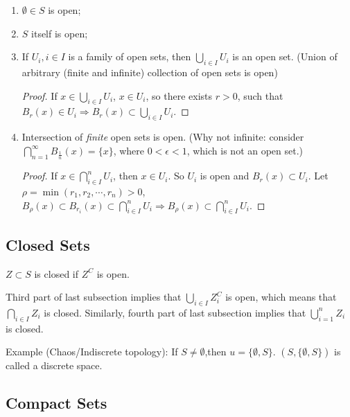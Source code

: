 \documentclass{article}
\begin{document}
        \begin{enumerate}
            \item $\emptyset \in S$ is open;
            \item $S$ itself is open;
            \item If $U_{i}, i \in I$ is a family of open sets, then $\bigcup_{i \in I} U_{i}$ is an open set. (Union of arbitrary (finite and infinite) collection of open sets is open)
            
            \begin{proof}
                If $x \in \bigcup_{i \in I} U_{i}$, $x \in U_{i}$, so there exists $r > 0$, such that $B_{r}(x) \in U_{i} \Rightarrow B_{r}(x) \subset \bigcup_{i \in I} U_{i}$.
            \end{proof}
        
            \item Intersection of \textit{finite} open sets is open. (Why not infinite: consider $\bigcap_{n = 1}^{\infty} B_{\frac{1}{n}} (x) = \{ x \}$, where $0 < \epsilon < 1$, which is not an open set.)
            
            \begin{proof}
                If $x \in \bigcap_{i \in I}^{n} U_{i}$, then $x \in U_{i}$. So $U_{i}$ is open and $B_{r}(x) \subset U_{i}$. Let $\rho = \min (r_{1}, r_{2}, \cdots, r_{n}) > 0$, $B_{\rho} (x) \subset B_{r_{i}}(x) \subset \bigcap_{i \in I}^{n} U_{i} \Rightarrow B_{\rho}(x) \subset \bigcap_{i \in I}^{n} U_{i}$.
            \end{proof}
        \end{enumerate}
    
        \subsection{Closed Sets}
        
        $Z \subset S$ is closed if $Z^{C}$ is open.
        
        Third part of last subsection implies that $\bigcup_{i \in I} Z_{i}^{C}$ is open, which means that $\bigcap_{i \in I} Z_{i}$ is closed. Similarly, fourth part of last subsection implies that $\bigcup_{i = 1}^{n} Z_{i}$ is closed.
        
        Example (Chaos/Indiscrete topology): If $S \neq \emptyset$,then $u = \{ \emptyset, S \}$. $(S, \{ \emptyset, S \})$ is called a discrete space.
    
        \subsection{Compact Sets}
    
\end{document}
